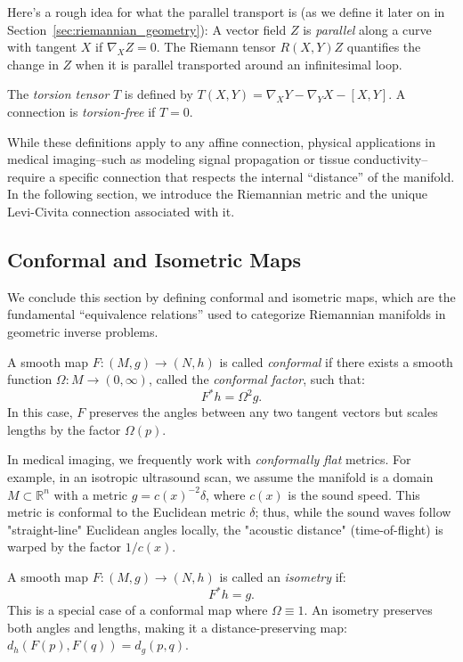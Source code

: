 Here's a rough idea for what the parallel transport is (as we define it later on in Section~\ref{sec:riemannian_geometry}): A vector field $Z$ is \emph{parallel} along a curve with tangent $X$ if $\nabla_X Z = 0$. The Riemann tensor $R(X, Y)Z$ quantifies the change in $Z$ when it is parallel transported around an infinitesimal loop.

\begin{definition}
  The \emph{torsion tensor} $T$ is defined by $T(X,Y) = \nabla_X Y - \nabla_Y X - [X,Y]$. A connection is \emph{torsion-free} if $T = 0$.
\end{definition}

While these definitions apply to any affine connection, physical applications in medical imaging--such as modeling signal propagation or tissue conductivity--require a specific connection that respects the internal ``distance'' of the manifold. In the following section, we introduce the Riemannian metric and the unique Levi-Civita connection associated with it.

\subsection{Conformal and Isometric Maps} We conclude this section by defining conformal and isometric maps, which are the fundamental ``equivalence relations'' used to categorize Riemannian manifolds in geometric inverse problems.

\begin{definition}
  A smooth map $F : (M, g) \to (N, h)$ is called \emph{conformal} if there exists a smooth function $\Omega : M \to (0, \infty)$, called the \emph{conformal factor}, such that:
  \[%
    F^*h = \Omega^2 g
  .\]%
  In this case, $F$ preserves the angles between any two tangent vectors but scales lengths by the factor $\Omega(p)$.
\end{definition}

In medical imaging, we frequently work with \emph{conformally flat} metrics. For example, in an isotropic ultrasound scan, we assume the manifold is a domain $M \subset \mathbb{R}^n$ with a metric $g = c(x)^{-2} \delta$, where $c(x)$ is the sound speed. This metric is conformal to the Euclidean metric $\delta$; thus, while the sound waves follow "straight-line" Euclidean angles locally, the "acoustic distance" (time-of-flight) is warped by the factor $1/c(x)$.

\begin{definition}
  A smooth map $F : (M, g) \to (N, h)$ is called an \emph{isometry} if:
  \[%
    F^*h = g
  .\]%
  This is a special case of a conformal map where $\Omega \equiv 1$. An isometry preserves both angles and lengths, making it a distance-preserving map: $d_h(F(p), F(q)) = d_g(p, q)$.
\end{definition}

